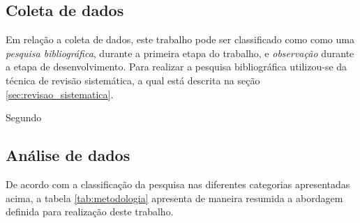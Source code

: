 	\subsection{Coleta de dados} %
	\label{sec:classificação_quanto_à_técnica_de_coleta_de_dados}

		Em relação a coleta de dados, este trabalho pode ser classificado como como uma \textit{pesquisa bibliográfica}, durante a primeira etapa do trabalho, e \textit{observação} durante a etapa de desenvolvimento. Para realizar a pesquisa bibliográfica utilizou-se da técnica de revisão sistemática, a qual está descrita na seção \ref{sec:revisao_sistematica}.

		Segundo 

	\subsection{Análise de dados} %
	\label{sec:classificação_quanto_à_técnica_de_análise_de_dados}
	

	De acordo com a classificação da pesquisa nas diferentes categorias apresentadas acima, a tabela \ref{tab:metodologia} apresenta de maneira resumida a abordagem definida para realização deste trabalho.

